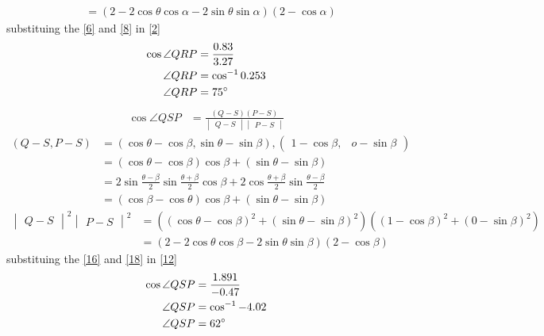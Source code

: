 \documentclass[12pt]{article}
\newcommand{\mydet}[1]{\ensuremath{\begin{vmatrix}#1\end{vmatrix}}}
\newcommand{\myvec}[1]{\ensuremath{\begin{pmatrix}#1\end{pmatrix}}}
\begin{document}
\begin{enumerate}
\begin{align}
	&=(2-2\cos\theta\cos\alpha-2\sin\theta\sin\alpha)(2-\cos\alpha)\label{8}
\end{align}
substituing the \eqref{6} and \eqref{8} in \eqref{2}
\begin{align}
\cos\angle QRP&=\frac{0.83}{3.27}\\
\angle QRP&=\cos^{-1}0.253\\
\angle QRP&=75\degree
\end{align}
\begin{align}
\cos\angle QSP&= \frac{ (Q-S) (P-S)}{\mydet{Q-S}\mydet{P-S}}\label{12}
\end{align}
\begin{align}
(Q-S, P-S) &= (\cos\theta-\cos\beta,\sin\theta-\sin\beta),\myvec{1-\cos\beta,& o-\sin\beta}\\
&=(\cos\theta-\cos\beta)\cos\beta+(\sin\theta-\sin\beta)\\
&=2\sin\frac{\theta-\beta}{2}\sin\frac{\theta+\beta}{2}\cos\beta+2\cos\frac{\theta+\beta}{2}\sin\frac{\theta-\beta}{2}\\
&=(\cos\beta-\cos\theta)\cos\beta+(\sin\theta-\sin\beta)\label{16}
\end{align}
\begin{align}
\mydet{Q-S}^2\mydet{P-S}^2 &= ((\cos\theta-\cos\beta)^2+(\sin\theta-\sin\beta)^2)
	((1-\cos\beta)^2+(0-\sin\beta)^2)\\
	&=(2-2\cos\theta\cos\beta-2\sin\theta\sin\beta)(2-\cos\beta)\label{18}
\end{align}
substituing the \eqref{16} and \eqref{18} in \eqref{12}
\begin{align}
\cos\angle QSP&=\frac{1.891}{-0.47}\\
\angle QSP&=\cos^{-1}-4.02\\
\angle QSP&=62\degree
\end{align}
\end{enumerate}
\end{document}
